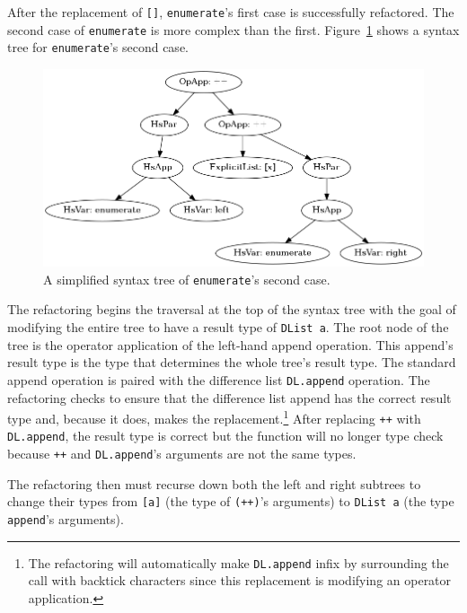After the replacement of \texttt{[]}, \texttt{enumerate}'s first case is successfully refactored. The second case of \texttt{enumerate} is more complex than the first. Figure~\ref{enumAST} shows a syntax tree for \texttt{enumerate}'s second case. 

\begin{figure}[h]
	\begin{center}
		\includegraphics[scale=.5]{graphVis/Chapter3/enumerate.png}
	\end{center}
	\caption{A simplified syntax tree of \texttt{enumerate}'s second case.}
	\label{enumAST}
\end{figure}

The refactoring begins the traversal at the top of the syntax tree with the goal of modifying the entire tree to have a result type of \texttt{DList a}. The root node of the tree is the operator application of the left-hand append operation. This append's result type is the type that determines the whole tree's result type. The standard append operation is paired with the difference list \texttt{DL.append} operation. The refactoring checks to ensure that the difference list append has the correct result type and, because it does, makes the replacement.\footnote{The refactoring will automatically make \texttt{DL.append} infix by surrounding the call with backtick characters since this replacement is modifying an operator application.} After replacing \texttt{++} with \texttt{DL.append}, the result type is correct but the function will no longer type check because \texttt{++} and \texttt{DL.append}'s arguments are not the same types. 

The refactoring then must recurse down both the left and right subtrees to change their types from \texttt{[a]} (the type of \texttt{(++)}'s arguments) to \texttt{DList a} (the type \texttt{append}'s arguments). 

